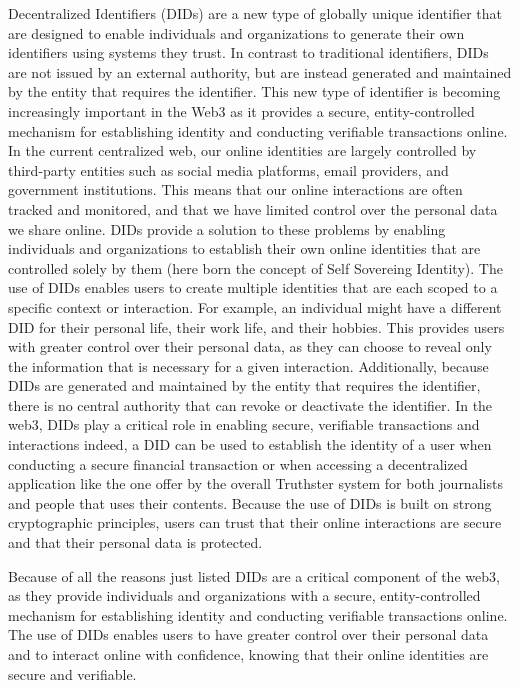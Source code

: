 \documentclass[target=mst,aauheader=]{thud}
\begin{document}
Decentralized Identifiers (DIDs) are a new type of globally unique identifier that are designed to enable individuals and organizations to generate their own identifiers using systems they trust. In contrast to traditional identifiers, DIDs are not issued by an external authority, but are instead generated and maintained by the entity that requires the identifier. This new type of identifier is becoming increasingly important in the Web3 as it provides a secure, entity-controlled mechanism for establishing identity and conducting verifiable transactions online.
In the current centralized web, our online identities are largely controlled by third-party entities such as social media platforms, email providers, and government institutions. This means that our online interactions are often tracked and monitored, and that we have limited control over the personal data we share online. DIDs provide a solution to these problems by enabling individuals and organizations to establish their own online identities that are controlled solely by them (here born the concept of Self Sovereing Identity\cite{selfSovereignIdentity}).
The use of DIDs enables users to create multiple identities that are each scoped to a specific context or interaction. For example, an individual might have a different DID for their personal life, their work life, and their hobbies. This provides users with greater control over their personal data, as they can choose to reveal only the information that is necessary for a given interaction. Additionally, because DIDs are generated and maintained by the entity that requires the identifier, there is no central authority that can revoke or deactivate the identifier.
In the web3, DIDs play a critical role in enabling secure, verifiable transactions and interactions indeed, a DID can be used to establish the identity of a user when conducting a secure financial transaction or when accessing a decentralized application like the one offer by the overall Truthster system for both journalists and people that uses their contents. Because the use of DIDs is built on strong cryptographic principles, users can trust that their online interactions are secure and that their personal data is protected.\par
Because of all the reasons just listed DIDs are a critical component of the web3, as they provide individuals and organizations with a secure, entity-controlled mechanism for establishing identity and conducting verifiable transactions online. The use of DIDs enables users to have greater control over their personal data and to interact online with confidence, knowing that their online identities are secure and verifiable.
\end{document}
